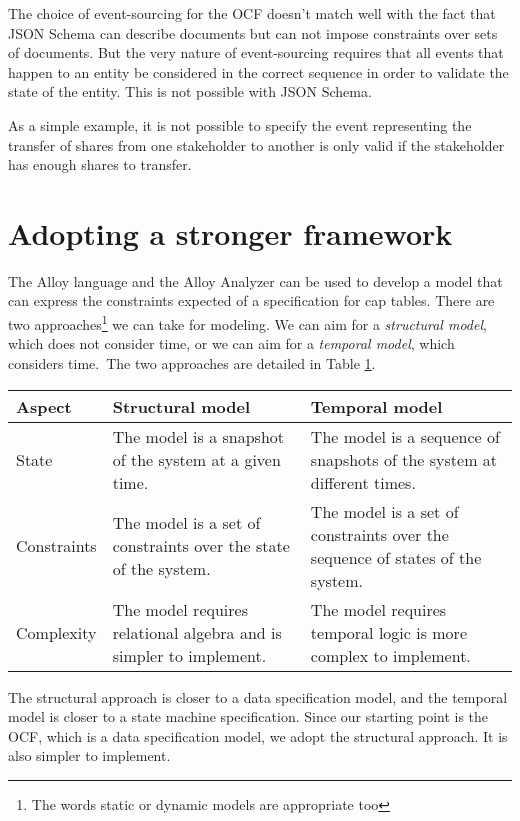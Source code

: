 \documentclass[12pt]{article}
\begin{document}
The choice of event-sourcing for the OCF doesn't match well with the fact that JSON Schema can describe documents but can not impose constraints over sets of documents. But the very nature of event-sourcing requires that all events that happen to an entity be considered in the correct sequence in order to validate the state of the entity. This is not possible with JSON Schema.

As a simple example, it is not possible to specify the event representing the transfer of shares from one stakeholder to another is only valid if the stakeholder has enough shares to transfer.

\section{Adopting a stronger framework}

The Alloy language and the Alloy Analyzer can be used to develop a model that can express the constraints expected of a specification for cap tables. There are two approaches\footnote{The words static or dynamic models are appropriate too} we can take for modeling. We can aim for a \textit{structural model}, which does not consider time, or we can aim for a \textit{temporal model}, which considers time.~The two approaches are detailed in Table \ref{tab:structural-vs-temporal}.

\begin{table}
\begin{tabularx}{\textwidth}{l X X}
\textbf{Aspect} & \textbf{Structural model} & \textbf{Temporal model} \\
\midrule
State & The model is a snapshot of the system at a given time. & The model is a sequence of snapshots of the system at different times. \\
\midrule
Constraints & The model is a set of constraints over the state of the system. & The model is a set of constraints over the sequence of states of the system. \\
\midrule 
Complexity & The model requires relational algebra and is simpler to implement. & The model requires temporal logic is more complex to implement. \\
\end{tabularx}
\label{tab:structural-vs-temporal}
\end{table}

The structural approach is closer to a data specification model, and the temporal model is closer to a state machine specification. Since our starting point is the OCF, which is a data specification model, we adopt the structural approach. It is also simpler to implement.
\end{document}
